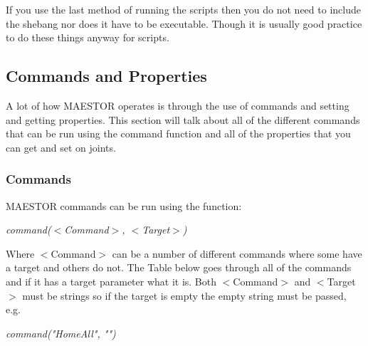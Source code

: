 \documentclass[12pt]{article}
\begin{document}
If you use the last method of running the scripts then you do not need to include the shebang nor does it have to be executable. Though it is usually good practice to do these things anyway for scripts. 

\subsection{Commands and Properties}

A lot of how MAESTOR operates is through the use of commands and setting and getting properties. This section will talk about all of the different commands that can be run using the command function and all of the properties that you can get and set on joints. 

\subsubsection{Commands}

MAESTOR commands can be run using the function: 

\begin{center}
	\textit{command($<$Command$>$, $<$Target$>$)}
\end{center}

Where $<$Command$>$ can be a number of different commands where some have a target and others do not. The Table below goes through all of the commands and if it has a target parameter what it is. Both $<$Command$>$ and $<$Target$>$ must be strings so if the target is empty the empty string must be passed, e.g.

\begin{center}
	\textit{command("HomeAll", "")}
\end{center}
\end{document}
